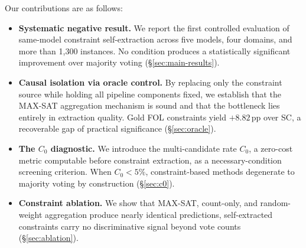 Our contributions are as follows:
\begin{itemize}
    \item \textbf{Systematic negative result.} We report the first controlled evaluation of same-model constraint self-extraction across five models, four domains, and more than 1,300 instances. No condition produces a statistically significant improvement over majority voting (\S\ref{sec:main-results}).
    \item \textbf{Causal isolation via oracle control.} By replacing only the constraint source while holding all pipeline components fixed, we establish that the MAX-SAT aggregation mechanism is sound and that the bottleneck lies entirely in extraction quality. Gold FOL constraints yield $+8.82$\,pp over SC, a recoverable gap of practical significance (\S\ref{sec:oracle}).
    \item \textbf{The $C_0$ diagnostic.} We introduce the multi-candidate rate $C_0$, a zero-cost metric computable before constraint extraction, as a necessary-condition screening criterion. When $C_0 < 5\%$, constraint-based methods degenerate to majority voting by construction (\S\ref{sec:c0}).
    \item \textbf{Constraint ablation.} We show that MAX-SAT, count-only, and random-weight aggregation produce nearly identical predictions, self-extracted constraints carry no discriminative signal beyond vote counts (\S\ref{sec:ablation}).
\end{itemize}
